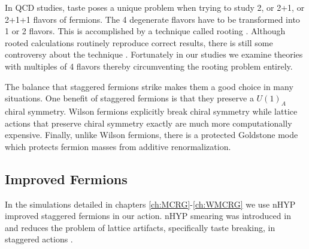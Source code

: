 In QCD studies, taste poses a unique problem when trying to study 2, or 2+1, or 2+1+1 flavors of fermions.
The 4 degenerate flavors have to be transformed into 1 or 2 flavors.
This is accomplished by a technique called rooting \cite{PhysRevD.72.114512}.
Although rooted calculations routinely reproduce correct results, there is still some controversy about the technique \cite{Creutz2007230,Creutz2007241,Kronfeld:2007ek}.
Fortunately in our studies we examine theories with multiples of 4 flavors thereby circumventing the rooting problem entirely.

The balance that staggered fermions strike makes them a good choice in many situations.
One benefit of staggered fermions is that they preserve a $U(1)_A$ chiral symmetry.
Wilson fermions explicitly break chiral symmetry while lattice actions that preserve chiral symmetry exactly are much more computationally expensive.
Finally, unlike Wilson fermions, there is a protected Goldstone mode which protects fermion masses from additive renormalization.

\subsection{Improved Fermions}

In the simulations detailed in chapters \ref{ch:MCRG}-\ref{ch:WMCRG} we use nHYP improved staggered fermions in our action.
nHYP smearing was introduced in \cite{Hasenfratz:2007rf} and reduces the problem of lattice artifacts, specifically taste breaking, in staggered actions \cite{Hasenfratz:2001tw}.

